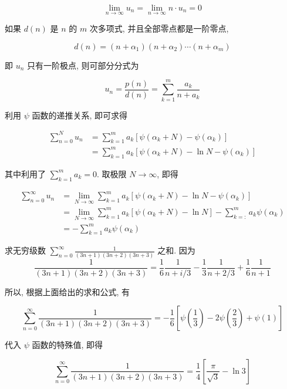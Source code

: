 $$
\lim _{n \rightarrow \infty} u_{n}=\lim _{n \rightarrow \infty} n \cdot u_{n}=0
$$

如果 $d(n)$ 是 $n$ 的 $m$ 次多项式, 并且全部零点都是一阶零点,

$$
d(n)=\left(n+\alpha_{1}\right)\left(n+\alpha_{2}\right) \cdots\left(n+\alpha_{m}\right)
$$

即 $u_{n}$ 只有一阶极点, 则可部分分式为

$$
u_{n}=\frac{p(n)}{d(n)}=\sum_{k=1}^{m} \frac{a_{k}}{n+a_{k}}
$$

利用 $\psi$ 函数的递推关系, 即可求得

$$
\begin{aligned}
\sum_{n=0}^{N} u_{n} & =\sum_{k=1}^{m} a_{k}\left[\psi\left(\alpha_{k}+N\right)-\psi\left(\alpha_{k}\right)\right] \\
& =\sum_{k=1}^{m} a_{k}\left[\psi\left(\alpha_{k}+N\right)-\ln N-\psi\left(\alpha_{k}\right)\right]
\end{aligned}
$$

其中利用了 $\sum_{k=1}^{m} a_{k}=0$. 取极限 $N \rightarrow \infty$, 即得

$$
\begin{aligned}
\sum_{n=0}^{\infty} u_{n} & =\lim _{N \rightarrow \infty} \sum_{k=1}^{m} a_{k}\left[\psi\left(\alpha_{k}+N\right)-\ln N-\psi\left(\alpha_{k}\right)\right] \\
& =\lim _{N \rightarrow \infty} \sum_{k=1}^{m} a_{k}\left[\psi\left(\alpha_{k}+N\right)-\ln N\right]-\sum_{k=:}^{m} a_{k} \psi\left(\alpha_{k}\right) \\
& =-\sum_{k=1}^{m} a_{k} \psi\left(\alpha_{k}\right)
\end{aligned}
$$

\begin{examplebox}{求无穷级数 $\sum_{n=0}^{\infty} \frac{1}{(3 n+1)(3 n+2)(3 n+3)}$ 之和.}
因为
$$
\frac{1}{(3 n+1)(3 n+2)(3 n+3)}=\frac{1}{6} \frac{1}{n+i / 3}-\frac{1}{3} \frac{1}{n+2 / 3}+\frac{1}{6} \frac{1}{n+1}
$$

所以, 根据上面给出的求和公式, 有

$$
\sum_{n=0}^{\infty} \frac{1}{(3 n+1)(3 n+2)(3 n+3)}=-\frac{1}{6}\left[\psi\left(\frac{1}{3}\right)-2 \psi\left(\frac{2}{3}\right)+\psi(1)\right]
$$

代入 $\psi$ 函数的特殊值, 即得

$$
\sum_{n=0}^{\infty} \frac{1}{(3 n+1)(3 n+2)(3 n+3)}=\frac{1}{4}\left[\frac{\pi}{\sqrt{3}}-\ln 3\right]
$$
\end{examplebox}

